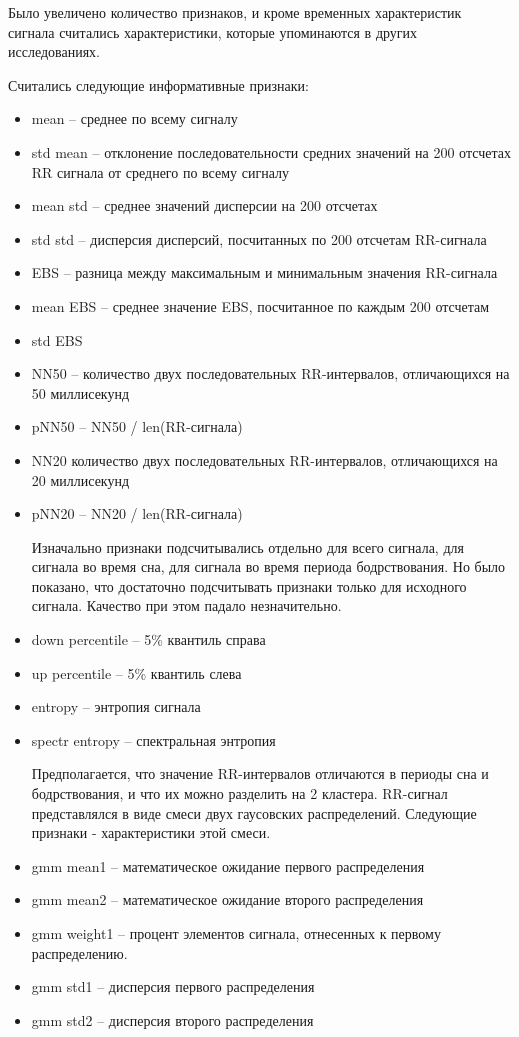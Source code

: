 Было увеличено количество признаков, и кроме временных характеристик сигнала считались характеристики, которые упоминаются в других исследованиях.

Считались следующие информативные признаки:
\begin{itemize}
	\item mean -- среднее по всему сигналу
	\item std mean -- отклонение последовательности средних значений на 200 отсчетах RR сигнала от среднего по всему сигналу
	\item mean std -- среднее значений дисперсии на 200 отсчетах
	\item std std -- дисперсия дисперсий, посчитанных по 200 отсчетам RR-сигнала
	\item EBS -- разница между максимальным и минимальным значения RR-сигнала
	\item mean EBS -- среднее значение EBS, посчитанное по каждым 200 отсчетам
	\item std EBS
	\item NN50 -- количество двух последовательных RR-интервалов, отличающихся на 50 миллисекунд
	\item pNN50 -- NN50 / len(RR-сигнала)
	\item NN20 количество двух последовательных RR-интервалов, отличающихся на 20 миллисекунд
	\item pNN20 -- NN20 / len(RR-сигнала)
	
    Изначально признаки подсчитывались отдельно для всего сигнала, для сигнала во время сна, для сигнала во время периода бодрствования. Но было показано, что достаточно подсчитывать признаки только для исходного сигнала. Качество при этом падало незначительно. 

	\item down percentile -- 5\% квантиль справа
	\item up percentile -- 5\% квантиль слева
	\item entropy -- энтропия сигнала
	\item spectr entropy -- спектральная энтропия
	
	Предполагается, что значение RR-интервалов отличаются в периоды сна и бодрствования, и что их можно разделить на 2 кластера. RR-сигнал представлялся в виде смеси двух гаусовских распределений. Следующие признаки - характеристики этой смеси. 
	
	\item gmm mean1 -- математическое ожидание первого распределения
	\item gmm mean2 -- математическое ожидание второго распределения
	\item gmm weight1 -- процент элементов сигнала, отнесенных к первому распределению.
	\item gmm std1 -- дисперсия первого распределения
	\item gmm std2 -- дисперсия второго распределения
	

\end{itemize}
